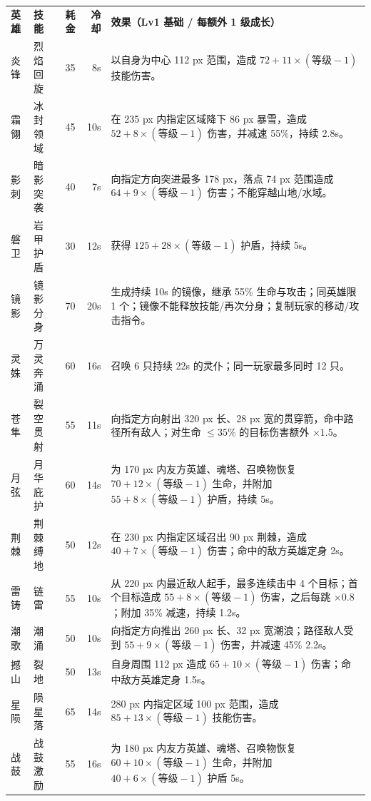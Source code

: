 \documentclass{ctexart}
\begin{document}
{\footnotesize
\begin{tabularx}{\textwidth}{@{}l l r r X@{}}
\rowcolor{teal}\color{white}\bfseries 英雄 & \color{white}\bfseries 技能 & \color{white}\bfseries 耗金 & \color{white}\bfseries 冷却 & \color{white}\bfseries 效果（Lv1 基础 / 每额外 1 级成长） \\
炎锋 & 烈焰回旋 & 35 & 8s & 以自身为中心 112 px 范围，造成 $72 + 11\times(\text{等级}-1)$ 技能伤害。 \\
霜翎 & 冰封领域 & 45 & 10s & 在 235 px 内指定区域降下 86 px 暴雪，造成 $52 + 8\times(\text{等级}-1)$ 伤害，并减速 55\%，持续 2.8s。 \\
影刺 & 暗影突袭 & 40 & 7s & 向指定方向突进最多 178 px，落点 74 px 范围造成 $64 + 9\times(\text{等级}-1)$ 伤害；不能穿越山地/水域。 \\
磐卫 & 岩甲护盾 & 30 & 12s & 获得 $125 + 28\times(\text{等级}-1)$ 护盾，持续 5s。 \\
镜影 & 镜影分身 & 70 & 20s & 生成持续 10s 的镜像，继承 55\% 生命与攻击；同英雄限 1 个；镜像不能释放技能/再次分身；复制玩家的移动/攻击指令。 \\
灵姝 & 万灵奔涌 & 60 & 16s & 召唤 6 只持续 22s 的灵仆；同一玩家最多同时 12 只。 \\
苍隼 & 裂空贯射 & 55 & 11s & 向指定方向射出 320 px 长、28 px 宽的贯穿箭，命中路径所有敌人；对生命 $\le 35\%$ 的目标伤害额外 $\times 1.5$。 \\
月弦 & 月华庇护 & 60 & 14s & 为 170 px 内友方英雄、魂塔、召唤物恢复 $70 + 12\times(\text{等级}-1)$ 生命，并附加 $55 + 8\times(\text{等级}-1)$ 护盾，持续 5s。 \\
荆棘 & 荆棘缚地 & 50 & 12s & 在 230 px 内指定区域召出 90 px 荆棘，造成 $40 + 7\times(\text{等级}-1)$ 伤害；命中的敌方英雄定身 2s。 \\
雷铸 & 链雷 & 55 & 10s & 从 220 px 内最近敌人起手，最多连续击中 4 个目标；首个目标造成 $55 + 8\times(\text{等级}-1)$ 伤害，之后每跳 $\times 0.8$；附加 35\% 减速，持续 1.2s。 \\
潮歌 & 潮涌 & 50 & 10s & 向指定方向推出 260 px 长、32 px 宽潮浪；路径敌人受到 $55 + 9\times(\text{等级}-1)$ 伤害，并减速 45\% 2.2s。 \\
撼山 & 裂地 & 50 & 13s & 自身周围 112 px 造成 $65 + 10\times(\text{等级}-1)$ 伤害；命中敌方英雄定身 1.5s。 \\
星陨 & 陨星落 & 65 & 14s & 280 px 内指定区域 100 px 范围，造成 $85 + 13\times(\text{等级}-1)$ 技能伤害。 \\
战鼓 & 战鼓激励 & 55 & 16s & 为 180 px 内友方英雄、魂塔、召唤物恢复 $60 + 10\times(\text{等级}-1)$ 生命，并附加 $40 + 6\times(\text{等级}-1)$ 护盾 5s。 \\
\end{tabularx}
}
\end{document}
